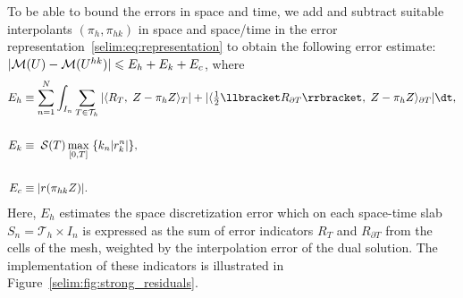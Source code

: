 To be able to bound the errors in space and time, we
add and subtract suitable interpolants $(\pi_h, \pi_{hk})$ in space
and space/time in the error
representation~\eqref{selim:eq:representation} to obtain the following
\apost{} error estimate: $|\mathcal{M}(U) - \mathcal{M}(U^{hk})| \leqslant  E_h +
E_k + E_c$, where
\begin{align}
  \label{selim:eq:aposteriori-Eh}
   E_h &\equiv \sum_{n=1}^{N}\int_{I_n} \sum_{T\in\mathcal{T}_h}| \langle
   R_T,\; Z - \pi_h Z \rangle_T |+ | \langle \tfrac{1}{2}\llbracket R_{\partial T}
   \rrbracket,\; Z - \pi_h Z \rangle _{\partial T}|\dt,
   \\\nonumber\\
   \label{selim:eq:aposteriori-Ek}
   E_k &\equiv\;\mathcal{S}(T)\max_{[0,T]}\;\{k_n | r_k ^n|\},
   \\\nonumber\\
   \label{selim:eq:aposteriori-Ec}
   E_c &\equiv |r(\pi_{hk}Z)|.
\end{align}
Here, $E_h$ estimates the space discretization error which on each
space-time slab $S_n = \mathcal{T}_h \times I_n$ is expressed as the sum
of error indicators $R_T$ and $R_{\partial T}$ from the cells of the
mesh, weighted by the interpolation error of the dual solution. The
implementation of these indicators is illustrated in Figure~\ref{selim:fig:strong_residuals}.


